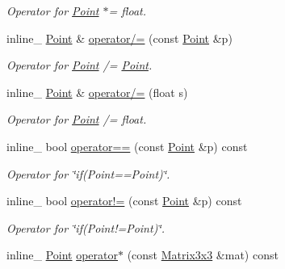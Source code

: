 \begin{DoxyCompactItemize}
\begin{DoxyCompactList}\small\item\em Operator for \hyperlink{class_point}{Point} $\ast$= float. \end{DoxyCompactList}\item 
\hypertarget{class_point_a998702e4800d00542fcc7fa635aa30b9}{inline\+\_\+ \hyperlink{class_point}{Point} \& \hyperlink{class_point_a998702e4800d00542fcc7fa635aa30b9}{operator/=} (const \hyperlink{class_point}{Point} \&p)}\label{class_point_a998702e4800d00542fcc7fa635aa30b9}

\begin{DoxyCompactList}\small\item\em Operator for \hyperlink{class_point}{Point} /= \hyperlink{class_point}{Point}. \end{DoxyCompactList}\item 
\hypertarget{class_point_aab3bbb00100c4c2ec9564fc758a74b2a}{inline\+\_\+ \hyperlink{class_point}{Point} \& \hyperlink{class_point_aab3bbb00100c4c2ec9564fc758a74b2a}{operator/=} (float s)}\label{class_point_aab3bbb00100c4c2ec9564fc758a74b2a}

\begin{DoxyCompactList}\small\item\em Operator for \hyperlink{class_point}{Point} /= float. \end{DoxyCompactList}\item 
\hypertarget{class_point_ad9515b3d10a1030945d7bf810b679acc}{inline\+\_\+ bool \hyperlink{class_point_ad9515b3d10a1030945d7bf810b679acc}{operator==} (const \hyperlink{class_point}{Point} \&p) const }\label{class_point_ad9515b3d10a1030945d7bf810b679acc}

\begin{DoxyCompactList}\small\item\em Operator for \char`\"{}if(\+Point==\+Point)\char`\"{}. \end{DoxyCompactList}\item 
\hypertarget{class_point_a9c1847f9b24e2c7611339f0754f81613}{inline\+\_\+ bool \hyperlink{class_point_a9c1847f9b24e2c7611339f0754f81613}{operator!=} (const \hyperlink{class_point}{Point} \&p) const }\label{class_point_a9c1847f9b24e2c7611339f0754f81613}

\begin{DoxyCompactList}\small\item\em Operator for \char`\"{}if(\+Point!=\+Point)\char`\"{}. \end{DoxyCompactList}\item 
\hypertarget{class_point_a225cacd80325f76e67cf9e703df48497}{inline\+\_\+ \hyperlink{class_point}{Point} \hyperlink{class_point_a225cacd80325f76e67cf9e703df48497}{operator$\ast$} (const \hyperlink{class_matrix3x3}{Matrix3x3} \&mat) const }\label{class_point_a225cacd80325f76e67cf9e703df48497}


\end{DoxyCompactItemize}
